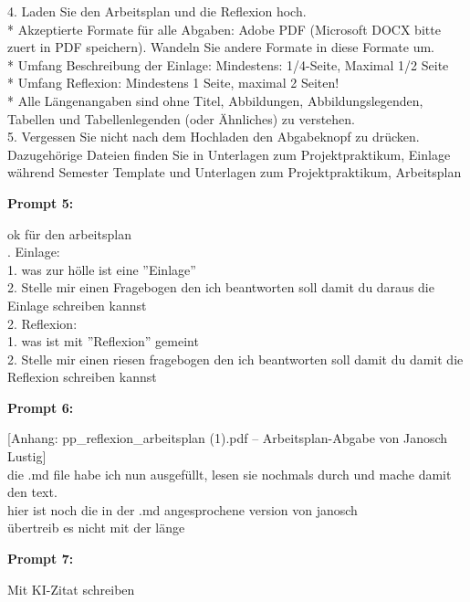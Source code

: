 {{4. Laden Sie den Arbeitsplan und die Reflexion hoch.\\
   * Akzeptierte Formate für alle Abgaben: Adobe PDF (Microsoft DOCX bitte zuert in PDF speichern). Wandeln Sie andere Formate in diese Formate um.\\
   * Umfang Beschreibung der Einlage: Mindestens: 1/4-Seite, Maximal 1/2 Seite\\
   * Umfang Reflexion: Mindestens 1 Seite, maximal 2 Seiten!\\
   * Alle Längenangaben sind ohne Titel, Abbildungen, Abbildungslegenden, Tabellen und Tabellenlegenden (oder Ähnliches) zu verstehen.\\
5. Vergessen Sie nicht nach dem Hochladen den Abgabeknopf zu drücken.\\
\smallskip
Dazugehörige Dateien finden Sie in Unterlagen zum Projektpraktikum, Einlage während Semester Template und Unterlagen zum Projektpraktikum, Arbeitsplan\\
}
\par\medskip\noindent\textbf{Prompt 5:}\\
{\ttfamily\raggedright
ok für den arbeitsplan\\
. Einlage:\\
   1. was zur hölle ist eine ''Einlage''\\
   2. Stelle mir einen Fragebogen den ich beantworten soll damit du daraus die Einlage schreiben kannst\\
2. Reflexion:\\
   1. was ist mit ''Reflexion'' gemeint\\
   2. Stelle mir einen riesen fragebogen den ich beantworten soll damit du damit die Reflexion schreiben kannst\\
}
\par\medskip\noindent\textbf{Prompt 6:}\\
{\ttfamily\raggedright
{[}Anhang: pp\_reflexion\_arbeitsplan (1).pdf – Arbeitsplan-Abgabe von Janosch Lustig{]}\\
die .md file habe ich nun ausgefüllt, lesen sie nochmals durch und mache damit den text.\\
\smallskip
hier ist noch die in der .md angesprochene version von janosch\\
\smallskip
übertreib es nicht mit der länge\\
}
\par\medskip\noindent\textbf{Prompt 7:}\\
{\ttfamily\raggedright
Mit KI-Zitat schreiben\\
}
}

